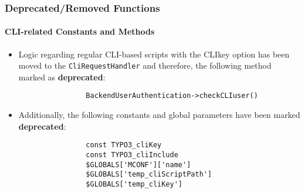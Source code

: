 
\begin{frame}[fragile]
	\frametitle{Deprecated/Removed Functions}
	\framesubtitle{CLI-related Constants and Methods}


	\begin{itemize}

		\item Logic regarding regular CLI-based scripts with the CLIkey option has been moved
			to the \texttt{CliRequestHandler} and therefore, the following method marked as
			 \textbf{deprecated}:

			\begin{lstlisting}
				BackendUserAuthentication->checkCLIuser()
			\end{lstlisting}

		\item Additionally, the following constants and global parameters have been marked
			 \textbf{deprecated}:

			\begin{lstlisting}
				const TYPO3_cliKey
				const TYPO3_cliInclude
				$GLOBALS['MCONF']['name']
				$GLOBALS['temp_cliScriptPath']
				$GLOBALS['temp_cliKey']
			\end{lstlisting}

	\end{itemize}

\end{frame}


